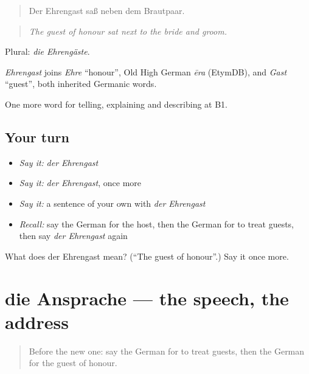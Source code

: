 \begin{quote}
Der Ehrengast saß neben dem Brautpaar.
\end{quote}

\begin{quote}
\emph{The guest of honour sat next to the bride and groom.}
\end{quote}

Plural: \emph{die Ehrengäste}.

\begin{cousinweb}
\emph{Ehrengast} joins \emph{Ehre} \textquotedblleft{}honour\textquotedblright{}, Old High German \emph{ēra} (EtymDB), and \emph{Gast} \textquotedblleft{}guest\textquotedblright{}, both inherited Germanic words.
\end{cousinweb}

\begin{grammarlens}[title={What you've built}]
One more word for telling, explaining and describing at B1.
\end{grammarlens}

\subsection*{Your turn}
\begin{itemize}
\raggedright
  \item \emph{Say it:} \emph{der Ehrengast}
  \item \emph{Say it:} \emph{der Ehrengast}, once more
  \item \emph{Say it:} a sentence of your own with \emph{der Ehrengast}
  \item \emph{Recall:} say the German for the host, then the German for to treat guests, then say \emph{der Ehrengast} again
\end{itemize}

\begin{tcolorbox}[breakable,colback=teal!4,colframe=teal!35!black,title={Before you move on}]
What does der Ehrengast mean? (\textquotedblleft{}The guest of honour\textquotedblright{}.) Say it once more.
\end{tcolorbox}
\section[die Ansprache]{die Ansprache — the speech, the address}

\label{lesson:GE-C307-ansprache}



\begin{quote}
Before the new one: say the German for to treat guests, then the German for the guest of honour.
\end{quote}


